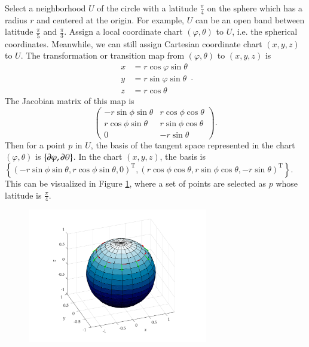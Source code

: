 \documentclass[11pt, a4paper]{book}
\begin{document}
\begin{Example}
  Select a neighborhood $U$ of the circle with a latitude $\frac{\pi}{4}$ on the sphere
  which has a radius $r$ and centered at the origin. For example, $U$ can be an open band
  between latitude $\frac{\pi}{5}$ and $\frac{\pi}{3}$. Assign a local coordinate chart
  $(\varphi, \theta)$ to $U$, i.e. the spherical coordinates. Meanwhile, we can still
  assign Cartesian coordinate chart $(x,y,z)$ to $U$. The transformation or transition map
  from $(\varphi,\theta)$ to $(x,y,z)$ is
  \begin{equation}
    \label{eq:spherical-coordinate-transform}
    \begin{aligned}
      x &= r \cos\varphi \sin\theta \\
      y &= r \sin\varphi \sin\theta \\
      z &= r \cos\theta
    \end{aligned}.
  \end{equation}
  The Jacobian matrix of this map is
  \begin{equation}
    \label{eq:spherical-coordinate-jacobi}
    \begin{pmatrix}
      -r\sin\phi \sin\theta & r\cos\phi \cos\theta \\
      r\cos\phi \sin\theta & r \sin\phi \cos\theta \\
      0 & -r\sin\theta
    \end{pmatrix}.
  \end{equation}
  Then for a point $p$ in $U$, the basis of the tangent space represented in the chart
  $(\varphi, \theta)$ is $\left\{ \boldsymbol{\partial}\varphi, \boldsymbol{\partial}\theta \right\}$. In
  the chart $(x,y,z)$, the basis is
  $\left\{ (-r\sin\phi \sin\theta, r\cos\phi \sin\theta, 0)^{\mathrm{T}}, (r\cos\phi
    \cos\theta, r\sin\phi \cos\theta, -r\sin\theta)^{\mathrm{T}} \right\}$. This can be
  visualized in Figure \ref{fig:basis-on-sphere}, where a set of points are selected as
  $p$ whose latitude is $\frac{\pi}{4}$.
  \begin{figure}[htbp]
    \centering
    \includegraphics[width=0.7\textwidth, height=\textheight, keepaspectratio]{figures/basis-on-sphere}
    \caption{}
    \label{fig:basis-on-sphere}
  \end{figure}
\end{Example}
\end{document}
